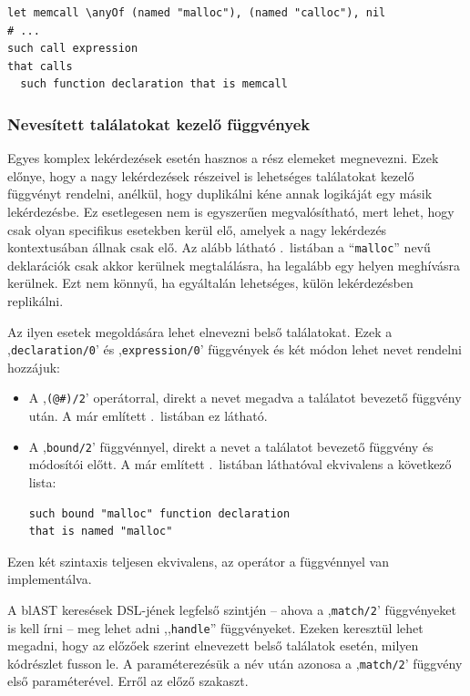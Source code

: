 \begin{lstlisting}
let memcall \anyOf (named "malloc"), (named "calloc"), nil
# ...
such call expression
that calls
  such function declaration that is memcall
\end{lstlisting}

\subsubsection*{Nevesített találatokat kezelő függvények}

Egyes komplex lekérdezések esetén hasznos a rész elemeket megnevezni.
Ezek előnye, hogy a nagy lekérdezések részeivel is lehetséges találatokat kezelő függvényt rendelni, anélkül, hogy duplikálni kéne annak logikáját egy másik lekérdezésbe.
Ez esetlegesen nem is egyszerűen megvalósítható, mert lehet, hogy csak olyan specifikus esetekben kerül elő, amelyek a nagy lekérdezés kontextusában állnak csak elő.
Az alább látható .~listában a {``{\tt malloc}''} nevű deklarációk csak akkor kerülnek megtalálásra, ha legalább egy helyen meghívásra kerülnek.
Ezt nem könnyű, ha egyáltalán lehetséges, külön lekérdezésben replikálni.

Az ilyen esetek megoldására lehet elnevezni belső találatokat.
Ezek a ,{\tt declaration/0}' és ,{\tt expression/0}' függvények és két módon lehet nevet rendelni hozzájuk:
\begin{itemize}
\item
A {,{\tt (@\#)/2}'} operátorral, direkt a nevet megadva a találatot bevezető függvény után.
A már említett .~listában ez látható.

\item
A {,{\tt bound/2}'} függvénnyel, direkt a nevet a találatot bevezető függvény és módosítói előtt.
A már említett .~listában láthatóval ekvivalens a következő lista:
\begin{lstlisting}
such bound "malloc" function declaration
that is named "malloc"
\end{lstlisting}
\end{itemize}
Ezen két szintaxis teljesen ekvivalens, az operátor a függvénnyel van implementálva.

A blAST keresések \gls{DSL}-jének legfelső szintjén -- ahova a ,{\tt match/2}' függvényeket is kell írni -- meg lehet adni ,,{\tt handle}'' függvényeket.
Ezeken keresztül lehet megadni, hogy az előzőek szerint elnevezett belső találatok esetén, milyen kódrészlet fusson le.
A paraméterezésük a név után azonosa a ,{\tt match/2}' függvény első paraméterével.
Erről \ld az előző szakaszt.


